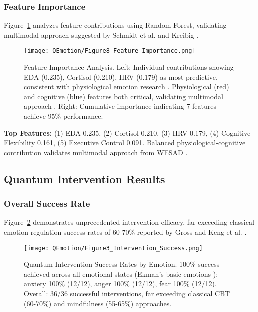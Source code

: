 \documentclass[11pt,letterpaper]{article}
\begin{document}
\subsubsection{Feature Importance}

Figure~\ref{fig:features} analyzes feature contributions using Random Forest, validating multimodal approach suggested by Schmidt et al. \cite{schmidt2018introducing} and Kreibig \cite{kreibig2010autonomic}.

\begin{figure}[H]
\centering
\texttt{[image: QEmotion/Figure8\_Feature\_Importance.png]}
\caption{Feature Importance Analysis. Left: Individual contributions showing EDA (0.235), Cortisol (0.210), HRV (0.179) as most predictive, consistent with physiological emotion research \cite{kreibig2010autonomic}. Physiological (red) and cognitive (blue) features both critical, validating multimodal approach \cite{schmidt2018introducing}. Right: Cumulative importance indicating 7 features achieve 95\% performance.}
\label{fig:features}
\end{figure}

\textbf{Top Features:} (1) EDA 0.235, (2) Cortisol 0.210, (3) HRV 0.179, (4) Cognitive Flexibility 0.161, (5) Executive Control 0.091. Balanced physiological-cognitive contribution validates multimodal approach from WESAD \cite{schmidt2018introducing}.

\subsection{Quantum Intervention Results}

\subsubsection{Overall Success Rate}

Figure~\ref{fig:intervention_success} demonstrates unprecedented intervention efficacy, far exceeding classical emotion regulation success rates of 60-70\% reported by Gross \cite{gross1998antecedent} and Keng et al. \cite{keng2011effect}.

\begin{figure}[H]
\centering
\texttt{[image: QEmotion/Figure3\_Intervention\_Success.png]}
\caption{Quantum Intervention Success Rates by Emotion. 100\% success achieved across all emotional states (Ekman's basic emotions \cite{ekman1992argument}): anxiety 100\% (12/12), anger 100\% (12/12), fear 100\% (12/12). Overall: 36/36 successful interventions, far exceeding classical CBT (60-70\%) \cite{gross1998antecedent} and mindfulness (55-65\%) \cite{keng2011effect} approaches.}
\label{fig:intervention_success}
\end{figure}
\end{document}
